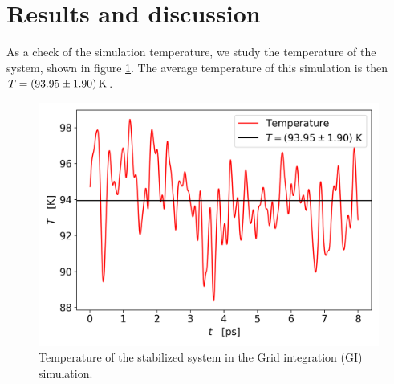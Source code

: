 \documentclass[%
aps,
pra,%
amsmath,amssymb,
preprint,%
reprint,%
notitlepage,
a4paper]{revtex4-1}
\begin{document}
\section{Results and discussion}
As a check of the simulation temperature, we study the temperature of the system, shown in figure \ref{fig:Tvst}. The average temperature of this simulation is then $T = \SI{93.95\pm1.90}{\kelvin}$.
\begin{figure}[t]
	\centering
	\includegraphics[width=0.9\linewidth]{../task2/results/Tvst}
	\caption{Temperature of the stabilized system in the Grid integration (GI) simulation.}
	\label{fig:Tvst}
\end{figure}
\end{document}
